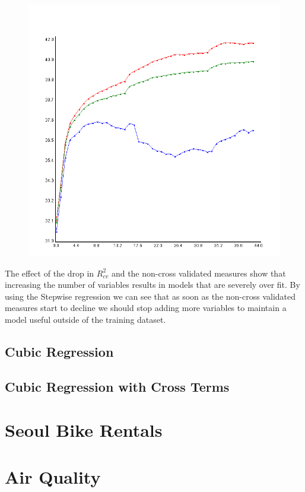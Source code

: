 \documentclass{article}
\begin{document}
\begin{figure}
\begin{center}
		
		\includegraphics[scale=0.25]{../plots/Wine/Scala/QuadraticCrossRegressionStepReg.png}
	\end{center}
	\end{figure}

	The effect of the drop in $R^2_{cv}$ and the non-cross validated measures show 
	that increasing the number of variables results in models that are severely over fit. 
	By using the Stepwise regression we can see that as soon as the non-cross validated 
	measures start to decline we should stop adding more variables to maintain a model useful 
	outside of the training dataset. 
	
	\subsection{Cubic Regression} 
	\subsection{Cubic Regression with Cross Terms} 
	
	
	\section{Seoul Bike Rentals}
	\section{Air Quality}
	
	
\end{document}
